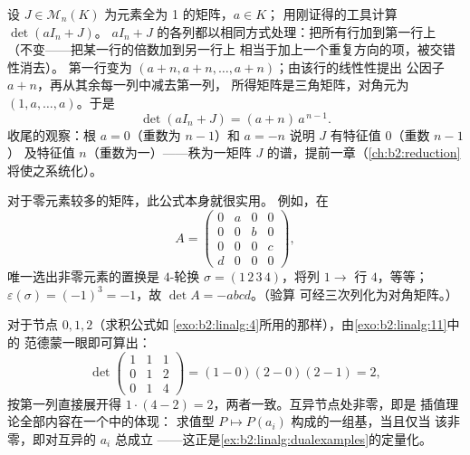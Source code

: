 \begin{example}[用运算法则计算行列式]\label{ex:b2:linalg:onesmatrix}
设 $J \in \mathcal{M}_n(K)$ 为元素全为 1 的矩阵，$a \in K$；
用刚证得的工具计算 $\det(aI_n + J)$。
$aI_n + J$ 的各列都以相同方式处理：把所有行加到第一行上
（不变——把某一行的倍数加到另一行上
相当于加上一个重复方向的项，被交错性消去）。
第一行变为 $(a + n, a + n, \dots, a + n)$；由该行的线性性提出
公因子 $a + n$，再从其余每一列中减去第一列，
所得矩阵是三角矩阵，对角元为
$(1, a, \dots, a)$。于是
\[
\det(aI_n + J) = (a + n)\,a^{\,n-1}.
\]
收尾的观察：根 $a = 0$（重数为 $n - 1$）和
$a = -n$ 说明 $J$ 有特征值 $0$（重数 $n - 1$）
及特征值 $n$（重数为一）——秩为一矩阵
$J$ 的谱，提前一章（\cref{ch:b2:reduction}
将使之系统化）。
\end{example}

\begin{example}[用置换公式计算行列式]\label{ex:b2:linalg:permexample}
对于零元素较多的矩阵，此公式本身就很实用。
例如，在
\[
A = \begin{pmatrix}
0 & a & 0 & 0\\
0 & 0 & b & 0\\
0 & 0 & 0 & c\\
d & 0 & 0 & 0
\end{pmatrix},
\]
唯一选出非零元素的置换是 $4$-轮换
$\sigma = (1\,2\,3\,4)$，将列 $1 \to$ 行 $4$，等等；
$\varepsilon(\sigma) = (-1)^3 = -1$，故 $\det A = -abcd$。（验算
可经三次列化为对角矩阵。）
\end{example}

\begin{example}[用乘积公式计算范德蒙行列式]\label{ex:b2:linalg:vandermondework}
对于节点 $0, 1, 2$（求积公式如
\cref{exo:b2:linalg:4}所用的那样），由\cref{exo:b2:linalg:11}中的
范德蒙一眼即可算出：
\[
\det\begin{pmatrix}
1 & 1 & 1\\
0 & 1 & 2\\
0 & 1 & 4
\end{pmatrix}
= (1 - 0)(2 - 0)(2 - 1) = 2 ,
\]
按第一列直接展开得 $1\cdot(4 - 2)
= 2$，两者一致。互异节点处非零，即是
插值理论全部内容在一个中的体现：
求值型 $P \mapsto P(a_i)$ 构成的一组基，当且仅当
该非零，即对互异的 $a_i$ 总成立
——这正是\cref{ex:b2:linalg:dualexamples}的定量化。
\end{example}

